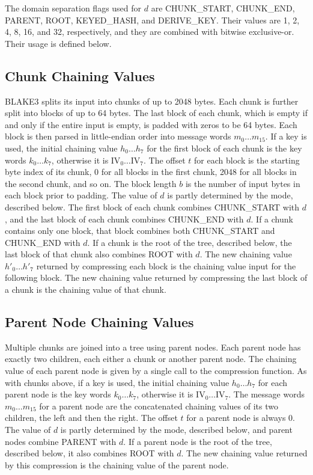\documentclass[11pt,notitlepage,a4paper]{article}
\newcommand{\IV}{\text{IV}}
\begin{document}
The domain separation flags used for $d$ are CHUNK\_START, CHUNK\_END, PARENT,
ROOT, KEYED\_HASH, and DERIVE\_KEY. Their values are 1, 2, 4, 8, 16, and 32,
respectively, and they are combined with bitwise exclusive-or. Their usage is
defined below.

\subsection{Chunk Chaining Values}\label{sec:chunk}

BLAKE3 splits its input into chunks of up to 2048 bytes. Each chunk is further
split into blocks of up to 64 bytes. The last block of each chunk, which is
empty if and only if the entire input is empty, is padded with zeros to be 64
bytes. Each block is then parsed in little-endian order into message words
$m_{0} \ldots m_{15}$. If a key is used, the initial chaining value $h_{0}
\ldots h_{7}$ for the first block of each chunk is the key words $k_{0} \ldots
k_{7}$, otherwise it is $\IV_{0} \ldots \IV_{7}$. The offset $t$ for each block
is the starting byte index of its chunk, 0 for all blocks in the first chunk,
2048 for all blocks in the second chunk, and so on. The block length $b$ is the
number of input bytes in each block prior to padding. The value of $d$ is
partly determined by the mode, described below. The first block of each chunk
combines CHUNK\_START with $d$, and the last block of each chunk combines
CHUNK\_END with $d$. If a chunk contains only one block, that block combines
both CHUNK\_START and CHUNK\_END with $d$. If a chunk is the root of the tree,
described below, the last block of that chunk also combines ROOT with $d$. The
new chaining value $h'_{0} \ldots h'_{7}$ returned by compressing each block is
the chaining value input for the following block. The new chaining value
returned by compressing the last block of a chunk is the chaining value of that
chunk.

\subsection{Parent Node Chaining Values}\label{sec:chunk}

Multiple chunks are joined into a tree using parent nodes. Each parent node has
exactly two children, each either a chunk or another parent node. The chaining
value of each parent node is given by a single call to the compression
function. As with chunks above, if a key is used, the initial chaining value
$h_{0} \ldots h_{7}$ for each parent node is the key words $k_{0} \ldots
k_{7}$, otherwise it is $\IV_{0} \ldots \IV_{7}$. The message words $m_{0}
\ldots m_{15}$ for a parent node are the concatenated chaining values of its
two children, the left and then the right. The offset $t$ for a parent node is
always 0. The value of $d$ is partly determined by the mode, described below,
and parent nodes combine PARENT with $d$. If a parent node is the root of the
tree, described below, it also combines ROOT with $d$. The new chaining value
returned by this compression is the chaining value of the parent node.
\end{document}
